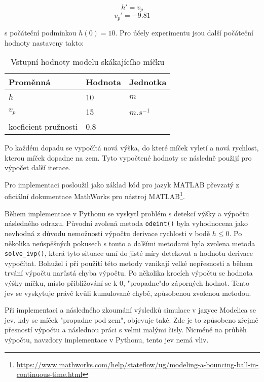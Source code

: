 \begin{equation}
    h' = v_p
\end{equation}
\begin{equation}
    v_p ' = -9.81
\end{equation}

s počáteční podmínkou $h(0) = 10$. Pro účely experimentu jsou další počáteční hodnoty nastaveny takto:

\begin{center}
\begin{table}[ht]
    \centering
\begin{tabular}{|l|l|l|}
\hline
Proměnná             & Hodnota & Jednotka    \\ \hline
$h$                    &   10     & $m$     \\ \hline
$v_p$                   &    15   & $m.s^{-1}$ \\ \hline
koeficient pružnosti &  0.8    &             \\ \hline
\end{tabular}
    \caption{Vstupní hodnoty modelu skákajícího míčku}
    \label{tab:micek-hodnoty}
\end{table}
\end{center}

Po každém dopadu se vypočítá nová výška, do které míček vyletí a nová rychlost, kterou míček dopadne na zem. Tyto vypočtené hodnoty se následně použijí pro výpočet další iterace. 

Pro implementaci posloužil jako základ kód pro jazyk MATLAB převzatý z oficiální dokumentace MathWorks pro nástroj MATLAB\footnote{\url{https://www.mathworks.com/help/stateflow/ug/modeling-a-bouncing-ball-in-continuous-time.html}}.

Během implementace v Pythonu se vyskytl problém s detekcí výšky a výpočtu následného odrazu. Původní zvolená metoda \texttt{odeint()} byla vyhodnocena jako nevhodná z důvodu nemožnosti výpočtu derivace rychlosti v bodě $h\leq0$. Po několika neúspěšných pokusech s touto a dalšími metodami byla zvolena metoda \texttt{solve\_ivp()}, která tyto situace umí do jisté míry detekovat a hodnotu derivace vypočítat. Bohužel i při použití této metody vznikají velké nepřesnosti a během trvání výpočtu narůstá chyba výpočtu. Po několika krocích výpočtu se hodnota výšky míčku, místo přibližování se k 0, "propadne"\space do záporných hodnot. Tento jev se vyskytuje právě kvůli kumulované chybě, způsobenou zvolenou metodou.

Při implementaci a následného zkoumání výsledků simulace v jazyce Modelica se jev, kdy se míček "propadne pod zem", objevuje také. Zde je to způsobeno zřejmě přesností výpočtu a následnou práci s velmi malými čisly. Nicméně na průběh výpočtu, navzdory implementace v Pythonu, tento jev nemá vliv.


